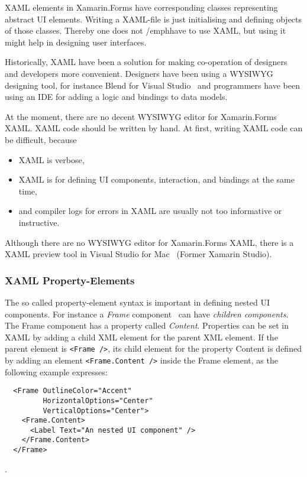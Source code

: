 \documentclass[conference]{IEEEtran}
\newcommand{\code}[1]{{\small\texttt{#1}}}
\begin{document}
XAML elements in Xamarin.Forms have corresponding classes representing abstract UI elements. Writing a XAML-file is just initialising and defining objects of those classes. Thereby one does not /emph{have to} use XAML, but using it might help in designing user interfaces.

Historically, XAML have been a solution for making co-operation of designers and developers more convenient. Designers have been using a WYSIWYG designing tool, for instance Blend for Visual Studio~\cite{blend} and programmers have been using an IDE for adding a logic and bindings to data models.

At the moment, there are no decent WYSIWYG editor for Xamarin.Forms XAML. XAML code should be written by hand. At first, writing XAML code can be difficult, because
\begin{itemize}
\item XAML is verbose,
\item XAML is for defining UI components, interaction, and bindings at the same time,
\item and compiler logs for errors in XAML are usually not too informative or instructive.
\end{itemize}

Although there are no WYSIWYG editor for Xamarin.Forms XAML, there is a XAML preview tool in Visual Studio for Mac~\cite{vsfm} (Former Xamarin Studio).

\subsubsection{XAML Property-Elements}

The so called property-element syntax is important in defining nested UI components. For instance a \emph{Frame} component~\cite{frame} can have \emph{children components}. The Frame component has a property called \emph{Content}. Properties can be set in XAML by adding a child XML element for the parent XML element. If the parent element is \code{<Frame />}, its child element for the property Content is defined by adding an element \code{<Frame.Content />} inside the Frame element, as the following example expresses:
\begin{lstlisting}
  <Frame OutlineColor="Accent"
         HorizontalOptions="Center"
         VerticalOptions="Center">
    <Frame.Content>
      <Label Text="An nested UI component" />
    </Frame.Content>
  </Frame>
\end{lstlisting}.
\end{document}
